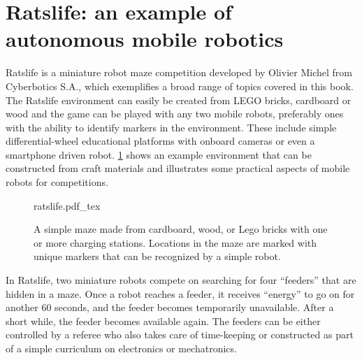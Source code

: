 \section{Ratslife: an example of autonomous mobile robotics}\label{sec:ratslife}
Ratslife is a miniature robot maze competition developed by Olivier Michel from Cyberbotics S.A., which exemplifies a broad range of topics covered in this book. The Ratslife environment can easily be created from LEGO bricks, cardboard or wood and the game can be played with any two mobile robots, preferably ones with the ability to identify markers in the environment. These include simple differential-wheel educational platforms with onboard cameras or even a smartphone driven robot. \cref{fig:ratslife} shows an example environment that can be constructed from craft materials and illustrates some practical aspects of mobile robots for competitions.


\begin{figure}
    \centering
    \def\svgwidth{\textwidth}
    {ratslife.pdf_tex}
    \caption{A simple maze made from cardboard, wood, or Lego bricks with one or more charging stations. Locations in the maze are marked with unique markers that can be recognized by a simple robot.}
    \label{fig:ratslife}
\end{figure}

In Ratslife, two miniature robots compete on searching for four ``feeders'' that are hidden in  a maze. Once a robot reaches a feeder, it receives ``energy'' to go on for another $60$ seconds, and the feeder becomes temporarily unavailable. After a short while, the feeder becomes available again. The feeders can be either controlled by a referee who also takes care of time-keeping or constructed as part of a simple curriculum on electronics or mechatronics.

